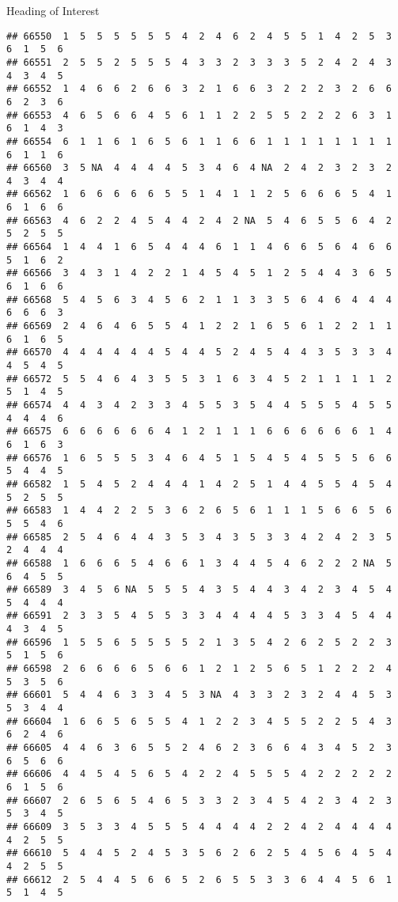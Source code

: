 \documentclass[
  ignorenonframetext,
]{beamer}
\begin{document}
\begin{frame}[fragile]{Heading of Interest}
\begin{verbatim}
## 66550  1  5  5  5  5  5  5  4  2  4  6  2  4  5  5  1  4  2  5  3  6  1  5  6
## 66551  2  5  5  2  5  5  5  4  3  3  2  3  3  3  5  2  4  2  4  3  4  3  4  5
## 66552  1  4  6  6  2  6  6  3  2  1  6  6  3  2  2  2  3  2  6  6  6  2  3  6
## 66553  4  6  5  6  6  4  5  6  1  1  2  2  5  5  2  2  2  6  3  1  6  1  4  3
## 66554  6  1  1  6  1  6  5  6  1  1  6  6  1  1  1  1  1  1  1  1  6  1  1  6
## 66560  3  5 NA  4  4  4  4  5  3  4  6  4 NA  2  4  2  3  2  3  2  4  3  4  4
## 66562  1  6  6  6  6  6  5  5  1  4  1  1  2  5  6  6  6  5  4  1  6  1  6  6
## 66563  4  6  2  2  4  5  4  4  2  4  2 NA  5  4  6  5  5  6  4  2  5  2  5  5
## 66564  1  4  4  1  6  5  4  4  4  6  1  1  4  6  6  5  6  4  6  6  5  1  6  2
## 66566  3  4  3  1  4  2  2  1  4  5  4  5  1  2  5  4  4  3  6  5  6  1  6  6
## 66568  5  4  5  6  3  4  5  6  2  1  1  3  3  5  6  4  6  4  4  4  6  6  6  3
## 66569  2  4  6  4  6  5  5  4  1  2  2  1  6  5  6  1  2  2  1  1  6  1  6  5
## 66570  4  4  4  4  4  4  5  4  4  5  2  4  5  4  4  3  5  3  3  4  4  5  4  5
## 66572  5  5  4  6  4  3  5  5  3  1  6  3  4  5  2  1  1  1  1  2  5  1  4  5
## 66574  4  4  3  4  2  3  3  4  5  5  3  5  4  4  5  5  5  4  5  5  4  4  4  6
## 66575  6  6  6  6  6  6  4  1  2  1  1  1  6  6  6  6  6  6  1  4  6  1  6  3
## 66576  1  6  5  5  5  3  4  6  4  5  1  5  4  5  4  5  5  5  6  6  5  4  4  5
## 66582  1  5  4  5  2  4  4  4  1  4  2  5  1  4  4  5  5  4  5  4  5  2  5  5
## 66583  1  4  4  2  2  5  3  6  2  6  5  6  1  1  1  5  6  6  5  6  5  5  4  6
## 66585  2  5  4  6  4  4  3  5  3  4  3  5  3  3  4  2  4  2  3  5  2  4  4  4
## 66588  1  6  6  6  5  4  6  6  1  3  4  4  5  4  6  2  2  2 NA  5  6  4  5  5
## 66589  3  4  5  6 NA  5  5  5  4  3  5  4  4  3  4  2  3  4  5  4  5  4  4  4
## 66591  2  3  3  5  4  5  5  3  3  4  4  4  4  5  3  3  4  5  4  4  4  3  4  5
## 66596  1  5  5  6  5  5  5  5  2  1  3  5  4  2  6  2  5  2  2  3  5  1  5  6
## 66598  2  6  6  6  6  5  6  6  1  2  1  2  5  6  5  1  2  2  2  4  5  3  5  6
## 66601  5  4  4  6  3  3  4  5  3 NA  4  3  3  2  3  2  4  4  5  3  5  3  4  4
## 66604  1  6  6  5  6  5  5  4  1  2  2  3  4  5  5  2  2  5  4  3  6  2  4  6
## 66605  4  4  6  3  6  5  5  2  4  6  2  3  6  6  4  3  4  5  2  3  6  5  6  6
## 66606  4  4  5  4  5  6  5  4  2  2  4  5  5  5  4  2  2  2  2  2  6  1  5  6
## 66607  2  6  5  6  5  4  6  5  3  3  2  3  4  5  4  2  3  4  2  3  5  3  4  5
## 66609  3  5  3  3  4  5  5  5  4  4  4  4  2  2  4  2  4  4  4  4  4  2  5  5
## 66610  5  4  4  5  2  4  5  3  5  6  2  6  2  5  4  5  6  4  5  4  4  2  5  5
## 66612  2  5  4  4  5  6  6  5  2  6  5  5  3  3  6  4  4  5  6  1  5  1  4  5

\end{verbatim}
\end{frame}
\end{document}
